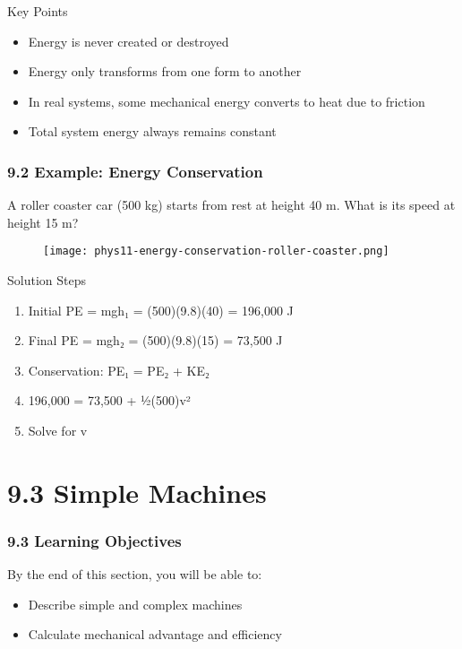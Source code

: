 \documentclass{beamer}
\begin{document}
\begin{frame}
\begin{exampleblock}{Key Points}
\begin{itemize}
\item Energy is never created or destroyed
\item Energy only transforms from one form to another
\item In real systems, some mechanical energy converts to heat due to friction
\item Total system energy always remains constant
\end{itemize}
\end{exampleblock}
\end{frame}

\begin{frame}
\frametitle{9.2 Example: Energy Conservation}
A roller coaster car (500 kg) starts from rest at height 40 m. What is its speed at height 15 m?
\begin{figure}
    \centering
    \texttt{[image: phys11-energy-conservation-roller-coaster.png]}
\end{figure}

\end{frame}


\begin{frame}
\begin{block}{Solution Steps}
\begin{enumerate}
\item Initial PE = mgh₁ = (500)(9.8)(40) = 196,000 J
\item Final PE = mgh₂ = (500)(9.8)(15) = 73,500 J
\item Conservation: PE₁ = PE₂ + KE₂
\item 196,000 = 73,500 + ½(500)v²
\item Solve for v
\end{enumerate}
\end{block}
\end{frame}

\section{9.3 Simple Machines}

\begin{frame}
\frametitle{9.3 Learning Objectives}
By the end of this section, you will be able to:
\begin{itemize}
\item Describe simple and complex machines
\item Calculate mechanical advantage and efficiency
\end{itemize}
\end{frame}
\end{document}

